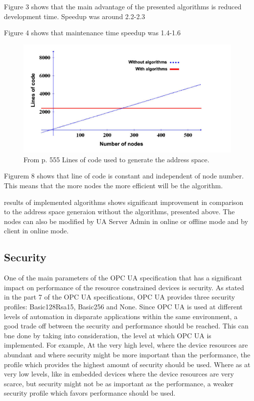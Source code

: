 \documentclass[conference]{IEEEtran}
\begin{document}
Figure 3 shows that the main advantage of the presented algorithms is reduced development time. Speedup was around 2.2-2.3

Figure 4 shows that  maintenance time speedup was 1.4-1.6 

\begin{figure}[ht]
\centering
\includegraphics[width=1\linewidth]{Figures/NodeAlgorithm}\quad
\caption[Subfigure example]{\label{f:NodeAlgorithm}From \cite{addressspace2012efficient} p. 555 Lines of code used to generate the address space.}
\end{figure}

Figurem 8 shows that line of code is constant and independent of node number. This means that the more nodes the more efficient will be the algorithm. 

results of implemented algorithms shows significant improvement in comparison to the address space generaion without the algorithms, presented above. The nodes can also be modified by UA Server Admin in online or offline mode and by client in online mode.

\subsection{Security}
One of the main parameters of the OPC UA specification that has a significant impact on performance of the resource constrained devices is security. As stated in the part 7 of the OPC UA specifications, OPC UA provides three security profiles: Basic128Rsa15, Basic256 and None. Since OPC UA is used at different levels of automation in disparate applications within the same environment, a good trade off between the security and performance should be reached. This can bne done by taking into consideration, the level at which OPC UA is implemented. For example, At the very high level, where the device resources are abundant and where security might be more important than the performance, the profile which provides the highest amount of security should be used. Where as at very low levels, like in embedded devices where the device resources are very scarce, but security might not be as important as the performance, a weaker security profile which favors performance should be used.
\end{document}
